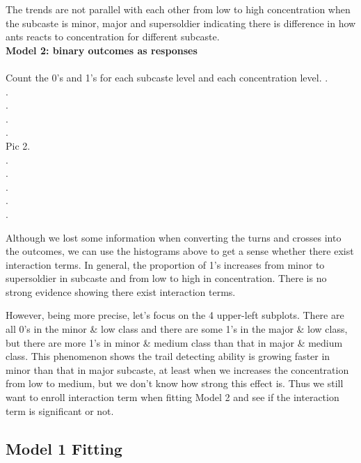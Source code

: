 \documentclass{article}
\begin{document}
		The trends are not parallel with each other from low to high concentration when the subcaste is minor, major and supersoldier indicating there is difference in how ants reacts to concentration for different subcaste. \\
		
		\noindent\textbf{Model 2: binary outcomes as responses}\\\\
		Count the 0’s and 1’s for each subcaste level and each concentration level.
		.\\
		.\\
		.\\
		.\\
		.\\
		Pic 2.\\
		.\\
		.\\
		.\\
		.\\
		. 
		
		Although we lost some information when converting the turns and crosses into the outcomes, we can use the histograms above to get a sense whether there exist interaction terms. In general, the proportion of 1’s increases from minor to supersoldier in subcaste and from low to high in concentration. There is no strong evidence showing there exist interaction terms. 
		
		However, being more precise, let’s focus on the 4 upper-left subplots. There are all 0’s in the minor \& low class and there are some 1’s in the major \& low class, but there are more 1’s in minor \& medium class than that in major \& medium class. This phenomenon shows the trail detecting ability is growing faster in minor than that in major subcaste, at least when we increases the concentration from low to medium, but we don’t know how strong this effect is. Thus we still want to enroll interaction term when fitting Model 2 and see if the interaction term is significant or not.		
		
	\subsection{Model 1 Fitting}
\end{document}
